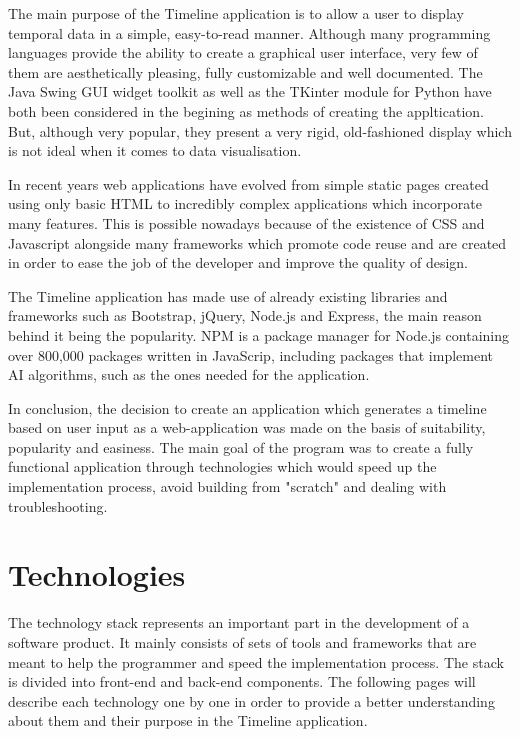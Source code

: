 \documentclass{report}
\begin{document}
The main purpose of the Timeline application is to allow a user to display temporal data in a simple, easy-to-read manner. Although many programming languages provide the ability to create a graphical user interface, very few of them are aesthetically pleasing, fully customizable and well documented. The Java Swing GUI widget toolkit as well as the TKinter module for Python have both been considered in the begining as methods of creating the appltication. But, although very popular, they present a very rigid, old-fashioned display which is not ideal when it comes to data visualisation. \par

In recent years web applications have evolved from simple static pages created using only basic HTML to incredibly complex applications which incorporate many features. This is possible nowadays because of the existence of CSS and Javascript alongside many frameworks which promote code reuse and are created in order to ease the job of the developer and improve the quality of design. \par

The Timeline application has made use of already existing libraries and frameworks such as Bootstrap, jQuery, Node.js and Express, the main reason behind it being the popularity. NPM is a package manager for Node.js containing over 800,000 packages written in JavaScrip, including packages that implement AI algorithms, such as the ones needed for the application.

In conclusion, the decision to create an application which generates a timeline based on user input as a web-application was made on the basis of suitability, popularity and easiness. The main goal of the program was to create a fully functional application through technologies which would speed up the implementation process, avoid building from "scratch" and dealing with troubleshooting. \par

\newpage

\chapter {Technologies}

The technology stack represents an important part in the development of a software product. It mainly consists of sets of tools and frameworks that are meant to help the programmer and speed the implementation process. The stack is divided into front-end and back-end components. The following pages will describe each technology one by one in order to provide a better understanding about them and their purpose in the Timeline application. 
 
\end{document}
